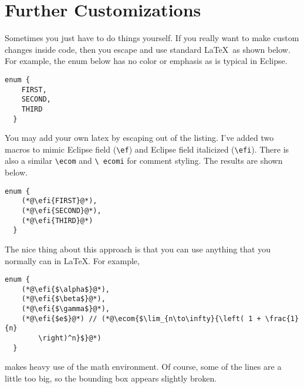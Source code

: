 \documentclass{article}
\begin{document}
\section*{Further Customizations}

Sometimes you just have to do things yourself.  If you really want to
make custom changes inside code, then you escape and use standard
\LaTeX\ as shown below.  For example, the enum below has no color or
emphasis as is typical in Eclipse. 


\begin{lstlisting}[caption={Without manual customizations.}, label={lst:nocustom}]
  enum {
    FIRST,
    SECOND,
    THIRD
  }
\end{lstlisting}


You may add your own latex by escaping out of the listing.  I've added
two macros to mimic Eclipse field (\texttt{\textbackslash ef}) and
Eclipse field italicized (\texttt{\textbackslash efi}).  There is also
a similar \texttt{\textbackslash ecom} and \texttt{\textbackslash
  ecomi} for comment styling. The results are shown below.


\begin{lstlisting}[caption={With manual customizations.}, label={lst:custom}]
  enum {
    (*@\efi{FIRST}@*),
    (*@\efi{SECOND}@*),
    (*@\efi{THIRD}@*)
  }
\end{lstlisting}


The nice thing about this approach is that you can use anything that
you normally can in \LaTeX.  For example,


\begin{lstlisting}[caption={Something a little different.}, label={lst:wacky}]
  enum {
    (*@\efi{$\alpha$}@*),
    (*@\efi{$\beta$}@*),
    (*@\efi{$\gamma$}@*),
    (*@\efi{$e$}@*) // (*@\ecom{$\lim_{n\to\infty}{\left( 1 + \frac{1}{n}
        \right)^n}$}@*)
  }
\end{lstlisting}

\noindent
makes heavy use of the math environment. Of course, some of the lines
are a little too big, so the bounding box appears slightly broken.
\end{document}

